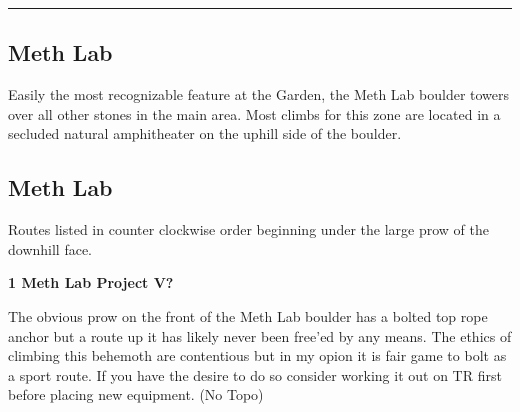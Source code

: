 \rule{\textwidth}{1pt}
\begin{multicols}{2}
		\section{Meth Lab}\label{sa:Meth Lab}
	\begin{minipage}{\columnwidth}
	Easily the most recognizable feature at the Garden, the Meth Lab boulder towers over all other stones in the main area. Most climbs for this zone are located in a secluded natural amphitheater on the uphill side of the boulder.
	\end{minipage}

			\subsection*{Meth Lab}\label{bf:Meth Lab}
			\begin{minipage}{\columnwidth}
			Routes listed in counter clockwise order beginning under the large prow of the downhill face.
			\end{minipage}
			
\label{pt:Octurnal}
					\begin{minipage}{\linewidth}	
					\label{rt:Meth Lab Project}\colorbox{black!20}{\textbf{1 Meth Lab Project V?  \warn \warn \warn }}
					\begin{adjustwidth}{0.5cm}{}				
					The obvious prow on the front of the Meth Lab boulder has a bolted top rope anchor but a route up it has likely never been free'ed by any means. The ethics of climbing this behemoth are contentious but in my opion it is fair game to bolt as a sport route. If you have the desire to do so consider working it out on TR first before placing new equipment.
						\newline (No Topo) 
					\end{adjustwidth}
					\end{minipage}


\end{multicols}
